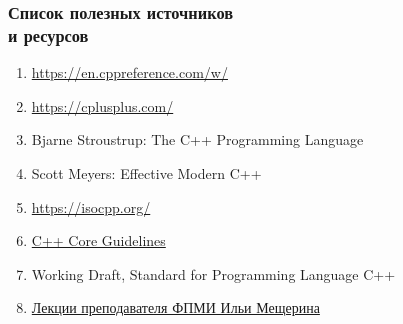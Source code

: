 \documentclass[compress]{beamer}
\begin{document}
\begin{frame}

    \frametitle{Список полезных источников \\ и ресурсов}

    \begin{enumerate}

        \item \url{https://en.cppreference.com/w/}

        \item \url{https://cplusplus.com/}

        \item Bjarne Stroustrup: The C++ Programming Language

        \item Scott Meyers: Effective Modern C++

        \item \url{https://isocpp.org/}

        \item \href{http://isocpp.github.io/CppCoreGuidelines/CppCoreGuidelines}{C++ Core Guidelines}

        \item Working Draft, Standard for Programming Language C++

        \item \href{https://www.youtube.com/@lectory\_fpmi}
            {Лекции преподавателя ФПМИ Ильи Мещерина}

    \end{enumerate}

\end{frame}
\end{document}
